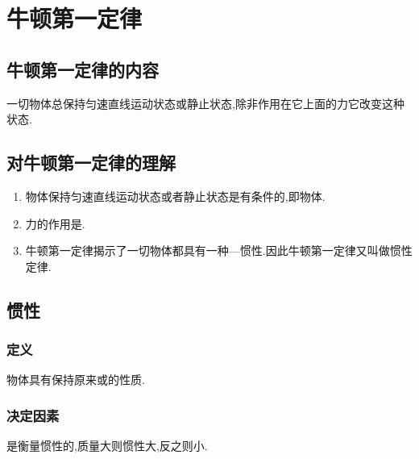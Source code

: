 \section{牛顿第一定律}
\subsection{牛顿第一定律的内容}
一切物体总保持匀速直线运动状态或静止状态,除非作用在它上面的力它改变这种状态.
\subsection{对牛顿第一定律的理解}
\begin{enumerate}
  \item 物体保持匀速直线运动状态或者静止状态是有条件的,即物体.
  \item 力的作用是.
  \item 牛顿第一定律揭示了一切物体都具有一种---惯性.因此牛顿第一定律又叫做惯性定律.
\end{enumerate}
\subsection{惯性}
\subsubsection{定义}
物体具有保持原来或的性质.
\subsubsection{决定因素}
是衡量惯性的,质量大则惯性大,反之则小.

